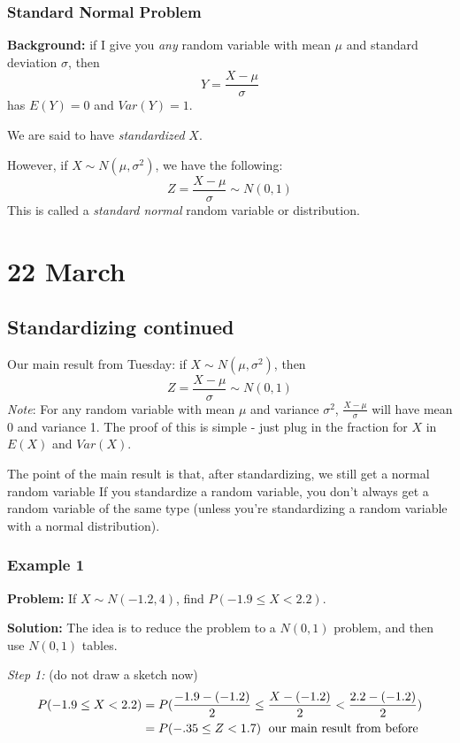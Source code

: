 \documentclass[12pt]{article}
\begin{document}
\subsubsection{Standard Normal Problem}
\textbf{Background:} if I give you \emph{any} random variable with mean $\mu$ and standard deviation $\sigma$, then 
\[
    Y = \frac{X - \mu}{\sigma}
\]
has $E(Y) = 0$ and $Var(Y) = 1$. 

We are said to have \emph{standardized} $X$.

However, if $X \sim N(\mu, \sigma^2)$, we have the following:
\[
    Z = \frac{X - \mu}{\sigma} \sim N(0,1)
\]
This is called a \emph{standard normal} random variable or distribution. 

\section{22 March}
\subsection{Standardizing continued}
Our main result from Tuesday: if $X \sim N(\mu, \sigma^2)$, then
\[
    Z = \frac{X - \mu}{\sigma} \sim N(0,1)
\]
\emph{Note}: For any random variable with mean $\mu$ and variance $\sigma^2$, $\frac{X-\mu}{\sigma}$ will have mean 0 and variance 1. The proof of this is simple - just plug in the fraction for $X$ in $E(X)$ and $Var(X)$.

The point of the main result is that, after standardizing, we still get a normal random variable If you standardize a random variable, you don't always get a random variable of the same type (unless you're standardizing a random variable with a normal distribution).

\subsubsection{Example 1}
\textbf{Problem:} If $X \sim N(-1.2, 4)$, find $P(-1.9 \leq X < 2.2)$.

\textbf{Solution:} The idea is to reduce the problem to a $N(0,1)$ problem, and then use $N(0,1)$ tables. 

\emph{Step 1:} (do not draw a sketch now)
\begin{align*}
    P(-1.9 \leq X < 2.2) &= P( \frac{-1.9-(-1.2)}{2} \leq \frac{X - (-1.2)}{2} < \frac{2.2-(-1.2)}{2}) \\
        &=  P(-.35 \leq Z < 1.7) \; \textnormal{ our main result from before }
\end{align*}
\end{document}

